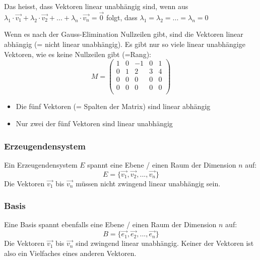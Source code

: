 Das heisst, dass Vektoren linear unabhängig sind, wenn aus $\lambda_1 \cdot \vec{v_1} +
\lambda_2 \cdot \vec{v_2} + ... + \lambda_n \cdot \vec{v_n} = \vec{0}$
folgt, dass $\lambda_1 = \lambda_2 = ... = \lambda_n = 0$

Wenn es nach der Gauss-Elimination Nullzeilen gibt, sind die Vektoren
linear abhängig (= nicht linear unabhängig). Es gibt nur so viele linear
unabhängige Vektoren, wie es keine Nullzeilen gibt (=Rang):
\[ M = \begin {pmatrix}
  1  &  0  &  -1  &  0  &  1  \\
  0  &  1  &   2  &  3  &  4  \\
  0  &  0  &   0  &  0  &  0  \\
  0  &  0  &   0  &  0  &  0  \\
\end {pmatrix} \]
\begin{itemize}
  \item Die fünf Vektoren (= Spalten der Matrix) sind linear abhängig
  \item Nur zwei der fünf Vektoren sind linear unabhängig
\end{itemize}

\subsubsection{Erzeugendensystem}
Ein Erzeugendensystem $E$ spannt eine Ebene / einen Raum der
Dimension $n$ auf:
\[ E = \{ \vec{v_1}, \vec{v_2}, ..., \vec{v_n}\} \]
Die Vektoren $\vec{v_1}$ bis $\vec{v_n}$ müssen nicht zwingend linear
unabhängig sein.

\subsubsection{Basis}
Eine Basis spannt ebenfalls eine Ebene / einen Raum der Dimension $n$
auf:
\[ B = \{ \vec{e_1}, \vec{e_2}, ..., \vec{e_n}\} \]
Die Vektoren $\vec{v_1}$ bis $\vec{v_n}$ sind zwingend linear
unabhängig. Keiner der Vektoren ist also ein Vielfaches eines anderen
Vektoren.

